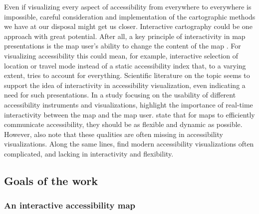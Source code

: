Even if visualizing every aspect of accessibility
from everywhere to everywhere is impossible,
careful consideration and implementation
of the cartographic methods we have at our disposal might get us closer.
Interactive cartography could be one approach with great potential.
After all, a key principle of interactivity in map presentations is
the map user's ability to change the content of the map \parencite{rot2013b}.
For visualizing accessibility this could mean, for example,
interactive selection of location or travel mode instead of
a static accessibility index that, to a varying extent,
tries to account for everything.
Scientific literature on the topic seems to support the idea of
interactivity in accessibility visualization,
even indicating a need for such presentations.
In a study focusing on the usability of
different accessibility instruments and visualizations,  %
\textcite{te2014} highlight the importance of
real-time interactivity between the map and the map user.
\textcite{but2018} state that for maps to efficiently communicate accessibility,
they should be as flexible and dynamic as possible.
However, \textcite{but2018} also note that
these qualities are often missing in accessibility visualizations.
Along the same lines,
\textcite{paj2021} find modern accessibility visualizations often complicated,
and lacking in interactivity and flexibility.


\subsection{Goals of the work}

\subsubsection{An interactive accessibility map}

